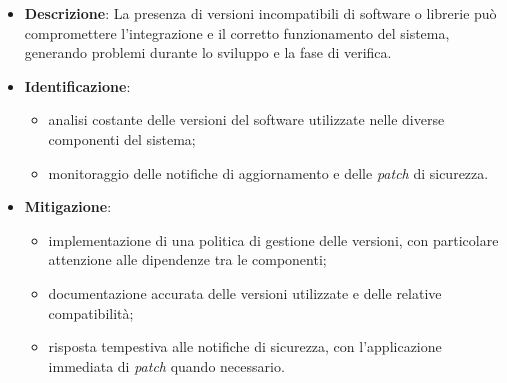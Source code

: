 \label{risk:incompatibilità delle versioni del software}
\begin{itemize}
	\item \textbf{Descrizione}:  La presenza di versioni incompatibili di software o librerie 
								può compromettere l'integrazione e il corretto funzionamento del 
								sistema, generando problemi durante lo sviluppo e la fase di verifica.
	\item \textbf{Identificazione}:
	      \begin{itemize}
		      \item analisi costante delle versioni del software utilizzate nelle diverse componenti del sistema;
		      
			  \item monitoraggio delle notifiche di aggiornamento e delle \textit{patch} di sicurezza.
	      \end{itemize}

	\item \textbf{Mitigazione}:
	      \begin{itemize}
		      \item implementazione di una politica di gestione delle versioni, 
			  		con particolare attenzione alle dipendenze tra le componenti;

		      \item documentazione accurata delle versioni utilizzate e delle relative compatibilità;
		      
			  \item risposta tempestiva alle notifiche di sicurezza, con l'applicazione immediata di \textit{patch} quando necessario.
	      \end{itemize}
\end{itemize}
